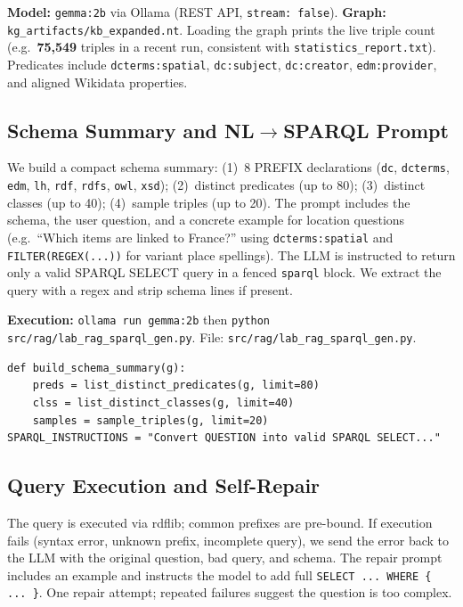 \documentclass[11pt,a4paper]{article}
\begin{document}
\textbf{Model:} \texttt{gemma:2b} via Ollama (REST API, \texttt{stream: false}). \textbf{Graph:} \texttt{kg\_artifacts/kb\_expanded.nt}. Loading the graph prints the live triple count (e.g.\ \textbf{75,549} triples in a recent run, consistent with \texttt{statistics\_report.txt}). Predicates include \texttt{dcterms:spatial}, \texttt{dc:subject}, \texttt{dc:creator}, \texttt{edm:provider}, and aligned Wikidata properties.

\subsection{Schema Summary and NL$\rightarrow$SPARQL Prompt}

We build a compact schema summary: (1)~8 PREFIX declarations (\texttt{dc}, \texttt{dcterms}, \texttt{edm}, \texttt{lh}, \texttt{rdf}, \texttt{rdfs}, \texttt{owl}, \texttt{xsd}); (2)~distinct predicates (up to 80); (3)~distinct classes (up to 40); (4)~sample triples (up to 20). The prompt includes the schema, the user question, and a concrete example for location questions (e.g.\ ``Which items are linked to France?'' using \texttt{dcterms:spatial} and \texttt{FILTER(REGEX(...))} for variant place spellings). The LLM is instructed to return only a valid SPARQL SELECT query in a fenced \texttt{sparql} block. We extract the query with a regex and strip schema lines if present.

\textbf{Execution:} \texttt{ollama run gemma:2b} then \texttt{python src/rag/lab\_rag\_sparql\_gen.py}. File: \texttt{src/rag/lab\_rag\_sparql\_gen.py}.

\begin{lstlisting}[caption={\texttt{src/rag/lab\_rag\_sparql\_gen.py} -- schema summary and NL->SPARQL prompt}]
def build_schema_summary(g):
    preds = list_distinct_predicates(g, limit=80)
    clss = list_distinct_classes(g, limit=40)
    samples = sample_triples(g, limit=20)
SPARQL_INSTRUCTIONS = "Convert QUESTION into valid SPARQL SELECT..."
\end{lstlisting}

\subsection{Query Execution and Self-Repair}

The query is executed via rdflib; common prefixes are pre-bound. If execution fails (syntax error, unknown prefix, incomplete query), we send the error back to the LLM with the original question, bad query, and schema. The repair prompt includes an example and instructs the model to add full \texttt{SELECT ... WHERE \{ ... \}}. One repair attempt; repeated failures suggest the question is too complex.
\end{document}
